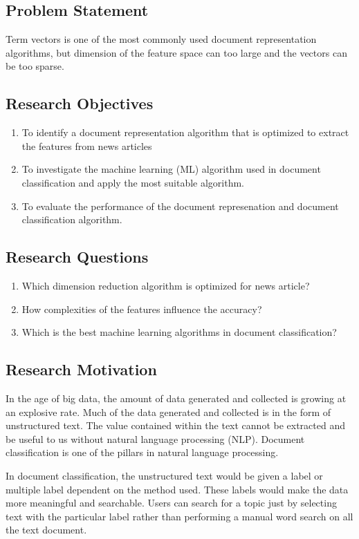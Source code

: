 \subsection{Problem Statement}
Term vectors is one of the most commonly used document representation algorithms, but dimension of the feature space can too large and the vectors can be too sparse. \cite{knnVectorSpaceReduction}

\subsection{Research Objectives}
\begin{enumerate}
	\item To identify a document representation algorithm that is optimized to extract the features from news articles
	\item To investigate the machine learning (ML) algorithm used in document classification and apply the most suitable algorithm.
	\item To evaluate the performance of the document represenation and document classification algorithm.
\end{enumerate}

\subsection{Research Questions}
\begin{enumerate}
	\item Which dimension reduction algorithm is optimized for news article?
	\item How complexities of the features influence the accuracy?
	\item Which is the best machine learning algorithms in document classification?
\end{enumerate}

\subsection{Research Motivation}
In the age of big data, the amount of data generated and collected is growing at an explosive 
rate. Much of the data generated and collected is in the form of unstructured text. The value 
contained within the text cannot be extracted and be useful to us without natural language 
processing (NLP). Document classification is one of the pillars in natural language processing.

In document classification, the unstructured text would be given a label or multiple label 
dependent on the method used. These labels would make the data more meaningful and 
searchable. Users can search for a topic just by selecting text with the particular label rather than performing a manual word search on all the text document.

